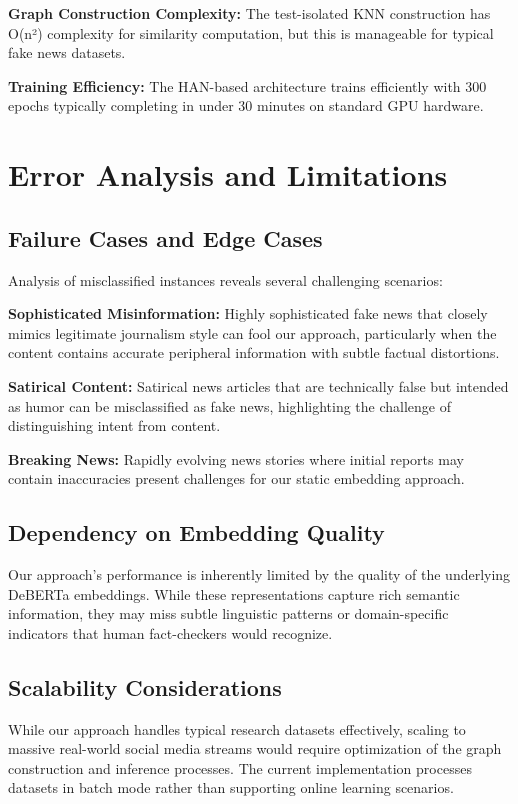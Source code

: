 \textbf{Graph Construction Complexity:} The test-isolated KNN construction has O(n²) complexity for similarity computation, but this is manageable for typical fake news datasets.

\textbf{Training Efficiency:} The HAN-based architecture trains efficiently with 300 epochs typically completing in under 30 minutes on standard GPU hardware.

\section{Error Analysis and Limitations}

\subsection{Failure Cases and Edge Cases}

Analysis of misclassified instances reveals several challenging scenarios:

\textbf{Sophisticated Misinformation:} Highly sophisticated fake news that closely mimics legitimate journalism style can fool our approach, particularly when the content contains accurate peripheral information with subtle factual distortions.

\textbf{Satirical Content:} Satirical news articles that are technically false but intended as humor can be misclassified as fake news, highlighting the challenge of distinguishing intent from content.

\textbf{Breaking News:} Rapidly evolving news stories where initial reports may contain inaccuracies present challenges for our static embedding approach.

\subsection{Dependency on Embedding Quality}

Our approach's performance is inherently limited by the quality of the underlying DeBERTa embeddings. While these representations capture rich semantic information, they may miss subtle linguistic patterns or domain-specific indicators that human fact-checkers would recognize.

\subsection{Scalability Considerations}

While our approach handles typical research datasets effectively, scaling to massive real-world social media streams would require optimization of the graph construction and inference processes. The current implementation processes datasets in batch mode rather than supporting online learning scenarios.

\EndChapter
